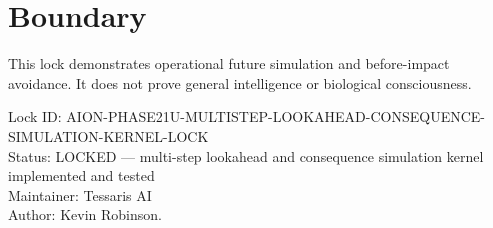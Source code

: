 \documentclass[11pt,a4paper]{article}
\begin{document}
\section{Boundary}

This lock demonstrates operational future simulation and before-impact avoidance. It does not prove general intelligence or biological consciousness.

\bigskip

\noindent
Lock ID: AION-PHASE21U-MULTISTEP-LOOKAHEAD-CONSEQUENCE-SIMULATION-KERNEL-LOCK\\
Status: LOCKED --- multi-step lookahead and consequence simulation kernel implemented and tested\\
Maintainer: Tessaris AI\\
Author: Kevin Robinson.
\end{document}
